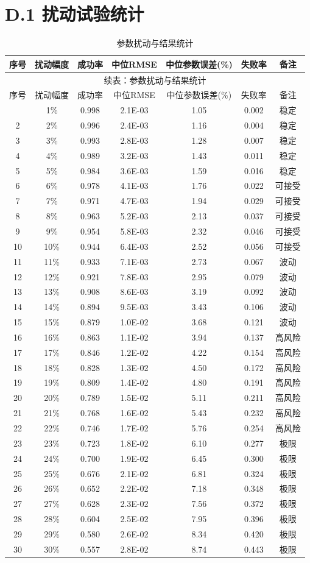 \section*{D.1 扰动试验统计}
{
\footnotesize
\begin{longtable}{ccccccc}
\caption{参数扰动与结果统计}\\
\toprule
序号 & 扰动幅度 & 成功率 & 中位RMSE & 中位参数误差(\%) & 失败率 & 备注\\
\midrule
\endfirsthead
\multicolumn{7}{c}{续表：参数扰动与结果统计}\\
\toprule
序号 & 扰动幅度 & 成功率 & 中位RMSE & 中位参数误差(\%) & 失败率 & 备注\\
\midrule
\endhead
\bottomrule
\endfoot
1&1\%&0.998&2.1E-03&1.05&0.002&稳定\\
2&2\%&0.996&2.4E-03&1.16&0.004&稳定\\
3&3\%&0.993&2.8E-03&1.28&0.007&稳定\\
4&4\%&0.989&3.2E-03&1.43&0.011&稳定\\
5&5\%&0.984&3.6E-03&1.59&0.016&稳定\\
6&6\%&0.978&4.1E-03&1.76&0.022&可接受\\
7&7\%&0.971&4.7E-03&1.94&0.029&可接受\\
8&8\%&0.963&5.2E-03&2.13&0.037&可接受\\
9&9\%&0.954&5.8E-03&2.32&0.046&可接受\\
10&10\%&0.944&6.4E-03&2.52&0.056&可接受\\
11&11\%&0.933&7.1E-03&2.73&0.067&波动\\
12&12\%&0.921&7.8E-03&2.95&0.079&波动\\
13&13\%&0.908&8.6E-03&3.19&0.092&波动\\
14&14\%&0.894&9.5E-03&3.43&0.106&波动\\
15&15\%&0.879&1.0E-02&3.68&0.121&波动\\
16&16\%&0.863&1.1E-02&3.94&0.137&高风险\\
17&17\%&0.846&1.2E-02&4.22&0.154&高风险\\
18&18\%&0.828&1.3E-02&4.50&0.172&高风险\\
19&19\%&0.809&1.4E-02&4.80&0.191&高风险\\
20&20\%&0.789&1.5E-02&5.11&0.211&高风险\\
21&21\%&0.768&1.6E-02&5.43&0.232&高风险\\
22&22\%&0.746&1.7E-02&5.76&0.254&高风险\\
23&23\%&0.723&1.8E-02&6.10&0.277&极限\\
24&24\%&0.700&1.9E-02&6.45&0.300&极限\\
25&25\%&0.676&2.1E-02&6.81&0.324&极限\\
26&26\%&0.652&2.2E-02&7.18&0.348&极限\\
27&27\%&0.628&2.3E-02&7.56&0.372&极限\\
28&28\%&0.604&2.5E-02&7.95&0.396&极限\\
29&29\%&0.580&2.6E-02&8.34&0.420&极限\\
30&30\%&0.557&2.8E-02&8.74&0.443&极限\\
\end{longtable}
}
